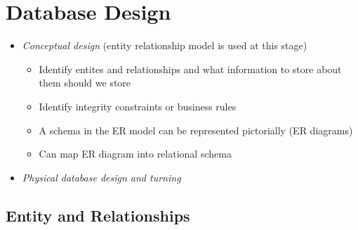 \chapter{Database Design}

\begin{itemize}
  \item \emph{Conceptual design} (entity relationship model is used at this
  stage)
  \begin{itemize}
    \item Identify entites and relationships and what information to store about
    them should we store
    \item Identify integrity constraints or business rules
    \item A schema in the ER model can be represented pictorially
    (ER diagrams)
    \item Can map ER diagram into relational schema
  \end{itemize}
  \item \emph{Physical database design and turning}
\end{itemize}

\section{Entity and Relationships}

  \begin{figure}
    \centering
  \end{figure}

